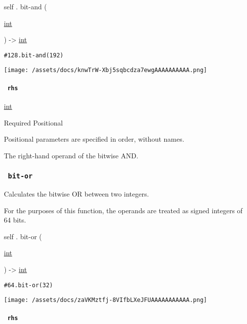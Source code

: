 self { . } { bit-and } (

{ \href{/docs/reference/foundations/int/}{int} }

) -\textgreater{} \href{/docs/reference/foundations/int/}{int}

\begin{verbatim}
#128.bit-and(192)
\end{verbatim}

\texttt{[image: /assets/docs/knwTrW-Xbj5sqbcdza7ewgAAAAAAAAAA.png]}

\paragraph{\texorpdfstring{\texttt{\ rhs\ }}{ rhs }}\label{definitions-bit-and-rhs}

\href{/docs/reference/foundations/int/}{int}

{Required} {{ Positional }}

\label{definitions-bit-and-rhs-positional-tooltip}
Positional parameters are specified in order, without names.

The right-hand operand of the bitwise AND.

\subsubsection{\texorpdfstring{\texttt{\ bit-or\ }}{ bit-or }}\label{definitions-bit-or}

Calculates the bitwise OR between two integers.

For the purposes of this function, the operands are treated as signed
integers of 64 bits.

self { . } { bit-or } (

{ \href{/docs/reference/foundations/int/}{int} }

) -\textgreater{} \href{/docs/reference/foundations/int/}{int}

\begin{verbatim}
#64.bit-or(32)
\end{verbatim}

\texttt{[image: /assets/docs/zaVKMztfj-8VIfbLXeJFUAAAAAAAAAAA.png]}

\paragraph{\texorpdfstring{\texttt{\ rhs\ }}{ rhs }}\label{definitions-bit-or-rhs}

